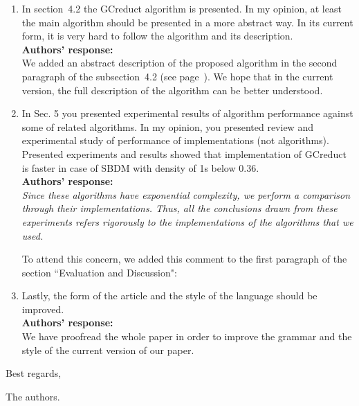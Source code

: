 \documentclass{letter}
\begin{document}
\begin{letter}{}
\begin{enumerate}
	\item In section~4.2 the GCreduct algorithm is presented. In my opinion, at least the main algorithm should be presented in a more abstract way. In its current form, it is very hard to follow the algorithm and its description.\\
	\textbf{Authors’ response:}\\
	We added an abstract description of the proposed algorithm in the second paragraph of the subsection~4.2 (see page~\pageref{abstarct}). We hope that in the current version, the full description of the algorithm can be better understood.

	\item In Sec. 5 you presented experimental results of algorithm performance against some of related algorithms. In my opinion, you presented review and experimental  study of performance of implementations (not algorithms). Presented experiments and results showed that implementation of GCreduct is faster in case of SBDM with density of 1s below 0.36.\\
	\textbf{Authors’ response:}\\
	\textit{Since these algorithms have exponential complexity, we perform a comparison through their implementations. Thus, all the conclusions drawn from these experiments refers rigorously to the implementations of the algorithms that we used.}
	
	To attend this concern, we added this comment to the first paragraph of the section ``Evaluation and Discussion":\\
	
	
	\item Lastly, the form of the article and the style of the language should be improved.\\
	\textbf{Authors’ response:}\\
	We have proofread the whole paper in order to improve the grammar and the style of the current version of our paper.
	
	
  \end{enumerate}     
  
  Best regards,

  The authors.
  
\end{letter}
\end{document}
